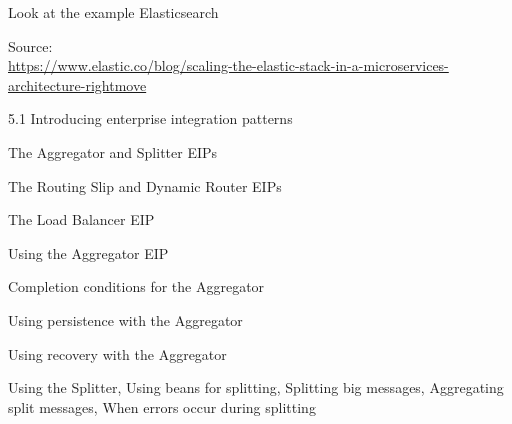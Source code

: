 \documentclass[Screen16to9,17pt]{foils}
\begin{document}

Look at the example Elasticsearch

Source:\\
{\footnotesize\url{https://www.elastic.co/blog/scaling-the-elastic-stack-in-a-microservices-architecture-rightmove}}







\begin{list2}
\item 5.1 Introducing enterprise integration patterns
\item The Aggregator and Splitter EIPs
\item The Routing Slip and Dynamic Router EIPs
\item The Load Balancer EIP
\end{list2}



\begin{list2}
\item Using the Aggregator EIP
\item Completion conditions for the Aggregator
\item Using persistence with the Aggregator
\item Using recovery with the Aggregator
\end{list2}











\begin{list2}
\item Using the Splitter, Using beans for splitting,
Splitting big messages, Aggregating split messages,
When errors occur during splitting
\end{list2}
\end{document}
